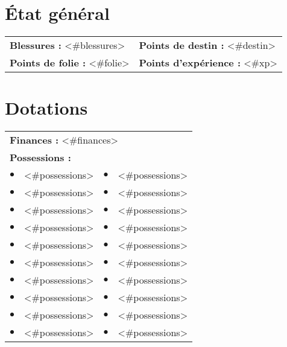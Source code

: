 \documentclass{scrartcl}
\begin{document}
\section*{{\'E}tat général}

\begin{tabular}{X{\arrlenZ} X{\arrlenZ}}
\textbf{Blessures :} <#blessures> & \textbf{Points de destin :} <#destin> \\
\textbf{Points de folie :} <#folie> & \textbf{Points d'expérience :} <#xp> \\
\end{tabular}

\section*{Dotations}

\begin{tabular}{cX{\arrlenZ} cX{\arrlenZ}}
\multicolumn{4}{l}{\textbf{Finances :} <#finances>} \\
\multicolumn{4}{l}{\textbf{Possessions :}} \\
$\bullet$ & <#possessions> & $\bullet$ & <#possessions> \\
$\bullet$ & <#possessions> & $\bullet$ & <#possessions> \\
$\bullet$ & <#possessions> & $\bullet$ & <#possessions> \\
$\bullet$ & <#possessions> & $\bullet$ & <#possessions> \\
$\bullet$ & <#possessions> & $\bullet$ & <#possessions> \\
$\bullet$ & <#possessions> & $\bullet$ & <#possessions> \\
$\bullet$ & <#possessions> & $\bullet$ & <#possessions> \\
$\bullet$ & <#possessions> & $\bullet$ & <#possessions> \\
$\bullet$ & <#possessions> & $\bullet$ & <#possessions> \\
$\bullet$ & <#possessions> & $\bullet$ & <#possessions> \\
\end{tabular}
\end{document}
